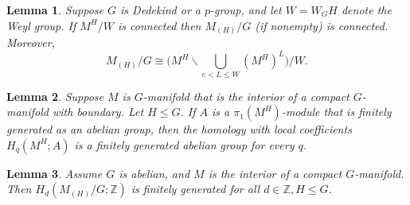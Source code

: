 \documentclass[10pt,a4paper]{amsart}
\newtheorem{lemma}{Lemma}
\newcommand{\Z}{\mathbb{Z}}
\begin{document}
\begin{lemma} \label{lem:hypothesis-translation}
Suppose $G$ is Dedekind or a $p$-group, and let $W = W_GH$ denote the Weyl
group. If $M^H/W$ is connected
then $M_{(H)}/G$ (if nonempty) is
connected. Moreover,
$$ M_{(H)}/G \cong \Big(M^H \backslash \bigcup_{e < L \leq W} (M^H)^L\Big)/W. $$
\end{lemma}

\begin{lemma}\label{lem:local-coeffs}
Suppose $M$ is $G$-manifold that is the interior of a compact $G$-manifold
with boundary. Let $H\leq G$. If $A$ is a $\pi_1(M^H)$-module that is finitely
generated as an abelian group, then the homology with local coefficients
$H_q(M^H;A)$ is a finitely generated abelian group for every $q$.
\end{lemma}

\begin{lemma} \label{lem:fg-homology}
Assume $G$ is abelian, and $M$ is the interior of a compact $G$-manifold.
Then $H_d(M_{(H)}/G; \Z)$ is finitely generated for all $d\in \Z,H\leq G$.
\end{lemma}
\end{document}
